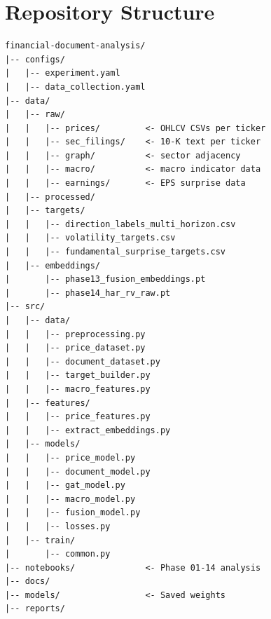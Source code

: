\documentclass[12pt, a4paper]{article}
\begin{document}
\section{Repository Structure}

\begin{lstlisting}[language={}, basicstyle=\ttfamily\footnotesize, frame=none, numbers=none]
financial-document-analysis/
|-- configs/
|   |-- experiment.yaml
|   |-- data_collection.yaml
|-- data/
|   |-- raw/
|   |   |-- prices/         <- OHLCV CSVs per ticker
|   |   |-- sec_filings/    <- 10-K text per ticker
|   |   |-- graph/          <- sector adjacency
|   |   |-- macro/          <- macro indicator data
|   |   |-- earnings/       <- EPS surprise data
|   |-- processed/
|   |-- targets/
|   |   |-- direction_labels_multi_horizon.csv
|   |   |-- volatility_targets.csv
|   |   |-- fundamental_surprise_targets.csv
|   |-- embeddings/
|       |-- phase13_fusion_embeddings.pt
|       |-- phase14_har_rv_raw.pt
|-- src/
|   |-- data/
|   |   |-- preprocessing.py
|   |   |-- price_dataset.py
|   |   |-- document_dataset.py
|   |   |-- target_builder.py
|   |   |-- macro_features.py
|   |-- features/
|   |   |-- price_features.py
|   |   |-- extract_embeddings.py
|   |-- models/
|   |   |-- price_model.py
|   |   |-- document_model.py
|   |   |-- gat_model.py
|   |   |-- macro_model.py
|   |   |-- fusion_model.py
|   |   |-- losses.py
|   |-- train/
|       |-- common.py
|-- notebooks/              <- Phase 01-14 analysis
|-- docs/
|-- models/                 <- Saved weights
|-- reports/
\end{lstlisting}
\end{document}
